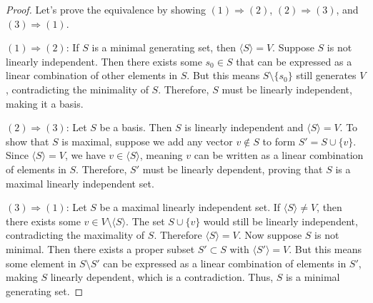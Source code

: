 \begin{proof}
  Let's prove the equivalence by showing $(1) \Rightarrow (2)$, $(2) \Rightarrow (3)$, and $(3) \Rightarrow (1)$.

  $(1) \Rightarrow (2)$: If $S$ is a minimal generating set, then $\langle S \rangle = V$. Suppose $S$ is not linearly independent. Then there exists some $s_0 \in S$ that can be expressed as a linear combination of other elements in $S$. But this means $S \setminus \{s_0\}$ still generates $V$, contradicting the minimality of $S$. Therefore, $S$ must be linearly independent, making it a basis.

  $(2) \Rightarrow (3)$: Let $S$ be a basis. Then $S$ is linearly independent and $\langle S \rangle = V$. To show that $S$ is maximal, suppose we add any vector $v \not\in S$ to form $S' = S \cup \{v\}$. Since $\langle S \rangle = V$, we have $v \in \langle S \rangle$, meaning $v$ can be written as a linear combination of elements in $S$. Therefore, $S'$ must be linearly dependent, proving that $S$ is a maximal linearly independent set.

  $(3) \Rightarrow (1)$: Let $S$ be a maximal linearly independent set. If $\langle S \rangle \neq V$, then there exists some $v \in V \setminus \langle S \rangle$. The set $S \cup \{v\}$ would still be linearly independent, contradicting the maximality of $S$. Therefore $\langle S \rangle = V$. Now suppose $S$ is not minimal. Then there exists a proper subset $S' \subset S$ with $\langle S' \rangle = V$. But this means some element in $S \setminus S'$ can be expressed as a linear combination of elements in $S'$, making $S$ linearly dependent, which is a contradiction. Thus, $S$ is a minimal generating set.
\end{proof}
